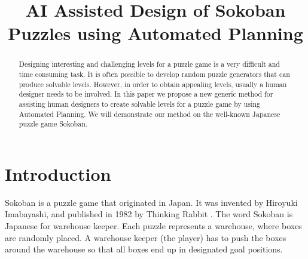 \documentclass[runningheads]{llncs}
\begin{document}
%
\title{AI Assisted Design of Sokoban Puzzles using Automated Planning}
%
%
%
%
%
\maketitle              %

\newcommand{\sokoimg}[1]{\texttt{[image: \#1]} \hspace{-0.30em}}

\newcommand{\w}{\sokoimg{figures/wall.pdf}}
\newcommand{\e}{\sokoimg{figures/empty.pdf}}
\newcommand{\p}{\sokoimg{figures/player.pdf}}
\newcommand{\x}{\sokoimg{figures/box.pdf}}
\newcommand{\g}{\sokoimg{figures/goal.pdf}}
\newcommand{\h}{\sokoimg{figures/goalbox.pdf}}
\newcommand{\n}{\\
\vspace{-0.1em}}

%
\begin{abstract}
Designing interesting and challenging levels for a puzzle game is a very difficult and time
consuming task. It is often possible to develop random puzzle generators that can produce
solvable levels. However, in order to obtain appealing levels, usually a human designer 
needs to be involved. In this paper we propose a new generic method for assisting human
designers to create solvable levels for a puzzle game by using Automated Planning. 
We will demonstrate our method on the well-known Japanese puzzle game Sokoban.

\end{abstract}
%
%
%
\section{Introduction}
Sokoban is a puzzle game that originated in Japan. It was invented by Hiroyuki
Imabayashi, and published in 1982 by Thinking Rabbit \cite{SokobanOfficial}.
The word Sokoban is Japanese for warehouse keeper.
Each puzzle represents a warehouse, where boxes are randomly placed. A warehouse
keeper (the player) has to push the boxes around the warehouse so that all boxes 
end up in designated goal positions.
\end{document}
